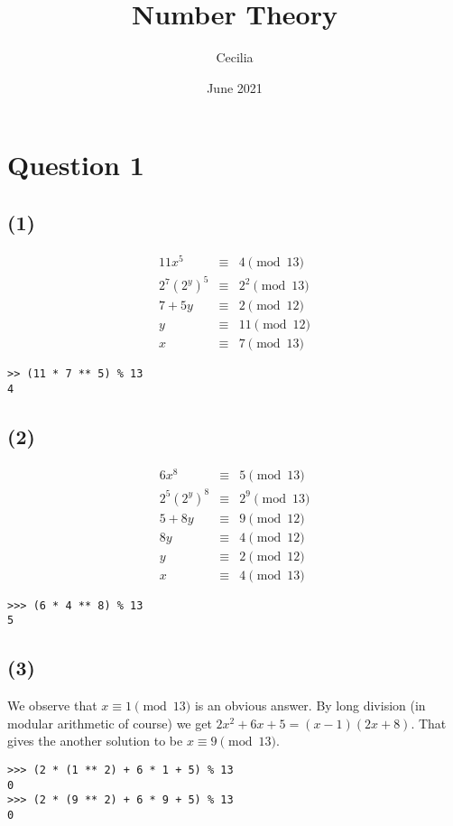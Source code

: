 \documentclass{article}
\title{Number Theory}
\author{Cecilia}
\date{June 2021}
\begin{document}
\maketitle
\section*{Question 1}
\subsection*{(1)}
\begin{eqnarray*}
        11x^5 & \equiv & 4   \pmod{13} \\
  2^7 (2^y)^5 & \equiv & 2^2 \pmod{13} \\
       7 + 5y & \equiv & 2   \pmod{12} \\
            y & \equiv & 11  \pmod{12} \\
            x & \equiv & 7   \pmod{13}
\end{eqnarray*}
\begin{verbatim}
>> (11 * 7 ** 5) % 13
4
\end{verbatim}

\subsection*{(2)}
\begin{eqnarray*}
         6x^8 & \equiv & 5   \pmod{13} \\
  2^5 (2^y)^8 & \equiv & 2^9 \pmod{13} \\
       5 + 8y & \equiv & 9   \pmod{12} \\
           8y & \equiv & 4   \pmod{12} \\
            y & \equiv & 2   \pmod{12} \\
            x & \equiv & 4   \pmod{13}
\end{eqnarray*}
\begin{verbatim}
>>> (6 * 4 ** 8) % 13
5
\end{verbatim}

\subsection*{(3)}
We observe that $ x \equiv 1 \pmod{13} $ is an obvious answer. By long division (in modular arithmetic of course) we get $ 2x^2 + 6x + 5 = (x - 1)(2x + 8) $. That gives the another solution to be $ x \equiv 9 \pmod{13} $.
\begin{verbatim}
>>> (2 * (1 ** 2) + 6 * 1 + 5) % 13
0
>>> (2 * (9 ** 2) + 6 * 9 + 5) % 13
0
\end{verbatim}
\end{document}
